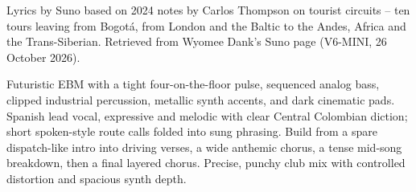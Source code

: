 
\begin{notes}
Lyrics by Suno based on 2024 notes by Carlos Thompson on tourist circuits -- ten tours leaving from Bogotá, from London and the Baltic to the Andes, Africa and the Trans-Siberian. Retrieved from Wyomee Dank's Suno page (V6-MINI, 26 October 2026).
\end{notes}
\begin{style}
Futuristic EBM with a tight four-on-the-floor pulse, sequenced analog bass, clipped industrial percussion, metallic synth accents, and dark cinematic pads. Spanish lead vocal, expressive and melodic with clear Central Colombian diction; short spoken-style route calls folded into sung phrasing. Build from a spare dispatch-like intro into driving verses, a wide anthemic chorus, a tense mid-song breakdown, then a final layered chorus. Precise, punchy club mix with controlled distortion and spacious synth depth.
\end{style}
